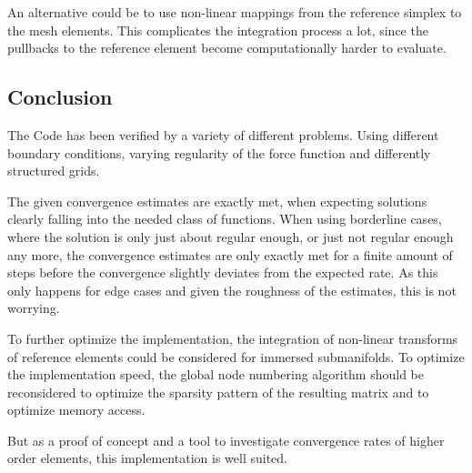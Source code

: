 \documentclass[11pt,a4paper]{article}
\begin{document}
\begin{multicols}{2}
An alternative could be to use non-linear mappings from the reference simplex to the mesh elements.
This complicates the integration process a lot, since the pullbacks to the reference element become
computationally harder to evaluate.

\subsection*{Conclusion}
The Code has been verified by a variety of different problems.
Using different boundary conditions, varying regularity of the force function
and differently structured grids.

The given convergence estimates are exactly met, when expecting solutions clearly falling
into the needed class of functions.
When using borderline cases, where the solution is only just about regular enough,
or just not regular enough any more, the convergence estimates are only exactly met
for a finite amount of steps before the convergence slightly deviates from the expected rate.
As this only happens for edge cases and given the roughness of the estimates, this is not worrying.


To further optimize the implementation, the integration of non-linear transforms of reference elements could be
considered for immersed submanifolds.
To optimize the implementation speed, the global node numbering algorithm should be reconsidered
to optimize the sparsity pattern of the resulting matrix and to optimize memory access.

But as a proof of concept and a tool to investigate convergence rates of higher order elements,
this implementation is well suited.

\end{multicols}
\end{document}
